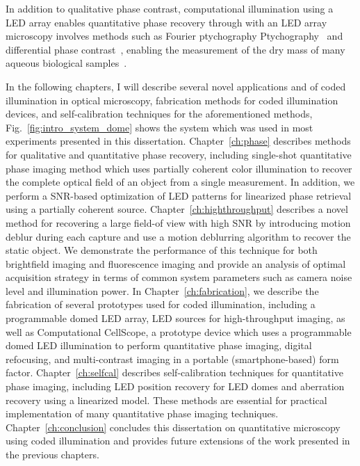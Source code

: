 In addition to qualitative phase contrast, computational illumination using a LED array enables quantitative phase recovery through with an LED array microscopy involves methods such as Fourier ptychography Ptychography~\cite{Zheng2013, Tian14} and differential phase contrast~\cite{mehta2009quantitative,
tian2015quantitative}, enabling the measurement of the dry mass of many aqueous biological samples~\cite{popescu2008imaging, popescu2008optical}.

In the following chapters, I will describe several novel applications and of coded illumination in optical microscopy, fabrication methods for coded illumination devices, and self-calibration techniques for the aforementioned methods, Fig.~\ref{fig:intro_system_dome} shows the system which was used in most experiments presented in this dissertation. Chapter~\ref{ch:phase} describes methods for qualitative and quantitative phase recovery, including single-shot quantitative phase imaging method which uses partially coherent color illumination to recover the complete optical field of an object from a single measurement. In addition, we perform a SNR-based optimization of LED patterns for linearized phase retrieval using a partially coherent source. Chapter~\ref{ch:highthroughput} describes a novel method for recovering a large field-of view with high SNR by introducing motion deblur during each capture and use a motion deblurring algorithm to recover the static object. We demonstrate the performance of this technique for both brightfield imaging and fluorescence imaging and provide an analysis of optimal acquisition strategy in terms of common system parameters such as camera noise level and illumination power. In Chapter~\ref{ch:fabrication}, we describe the fabrication of several prototypes used for coded illumination, including a programmable domed LED array, LED sources for high-throughput imaging, as well as Computational CellScope, a prototype device which uses a programmable domed LED illumination to perform quantitative phase imaging, digital refocusing, and multi-contrast imaging in a portable (smartphone-based) form factor. Chapter~\ref{ch:selfcal} describes self-calibration techniques for quantitative phase imaging, including LED position recovery for LED domes and aberration recovery using a linearized model. These methods are essential for practical implementation of many quantitative phase imaging techniques. Chapter~\ref{ch:conclusion} concludes this dissertation on quantitative microscopy using coded illumination and provides future extensions of the work presented in the previous chapters.


